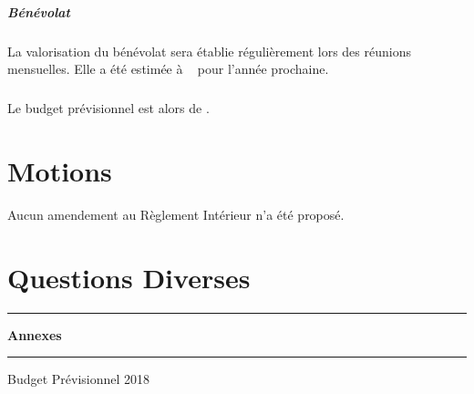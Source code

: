 \documentclass[11pt]{article}
\begin{document}
\subparagraph{Bénévolat}La valorisation du bénévolat sera établie régulièrement lors des réunions mensuelles.
Elle a été estimée à \officialeuro~ pour l'année prochaine.

\subparagraph{}Le budget prévisionnel est alors de \officialeuro.

\section{Motions}
Aucun amendement au Règlement Intérieur n'a été proposé.

\section{Questions Diverses}

\newpage

\clearpage
\thispagestyle{empty}
\vspace*{\fill}
\begin{center}
\hrule
\vspace{.3cm}
\Huge\bfseries Annexes
\vspace{.3cm}
\hrule
\vspace{2cm}
\Large
\noindent Budget Prévisionnel 2018
\end{center}
\vspace*{\fill}


\end{document}
